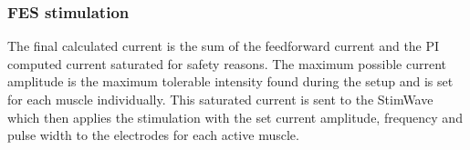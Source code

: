 \subsubsection{FES stimulation}
The final calculated current is the sum of the feedforward current and the PI computed current saturated for safety reasons. The maximum possible current amplitude is the maximum tolerable intensity found during the setup and is set for each muscle individually. This saturated current is sent to the StimWave which then applies the stimulation with the set current amplitude, frequency and pulse width to the electrodes for each active muscle.


























 





































